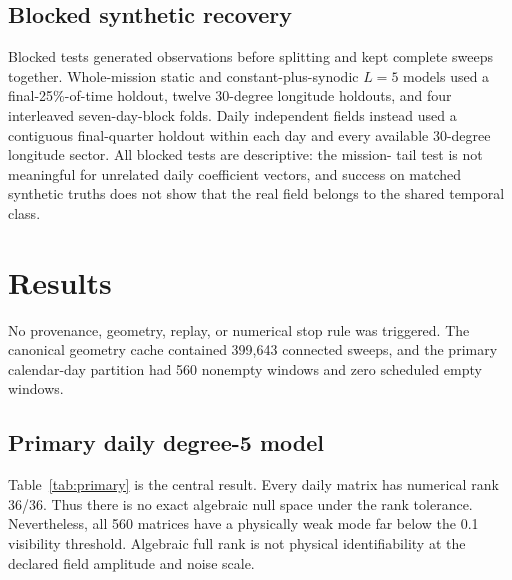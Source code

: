 \documentclass[11pt]{article}
\begin{document}
\subsection{Blocked synthetic recovery}

Blocked tests generated observations before splitting and kept complete
sweeps together.  Whole-mission static and constant-plus-synodic $L=5$ models
used a final-25\%-of-time holdout, twelve 30-degree longitude holdouts, and four
interleaved seven-day-block folds.  Daily independent fields instead used a
contiguous final-quarter holdout within each day and every available
30-degree longitude sector.  All blocked tests are descriptive: the mission-
tail test is not meaningful for unrelated daily coefficient vectors, and
success on matched synthetic truths does not show that the real field belongs
to the shared temporal class.

\section{Results}

No provenance, geometry, replay, or numerical stop rule was triggered.  The
canonical geometry cache contained 399,643 connected sweeps, and the primary
calendar-day partition had 560 nonempty windows and zero scheduled empty
windows.

\subsection{Primary daily degree-5 model}

Table~\ref{tab:primary} is the central result.  Every daily matrix has
numerical rank 36/36.  Thus there is no exact algebraic null space under the
rank tolerance.  Nevertheless, all 560 matrices have a physically weak mode
far below the 0.1 visibility threshold.  Algebraic full rank is not physical
identifiability at the declared field amplitude and noise scale.
\end{document}
